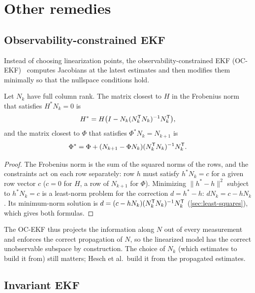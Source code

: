 \section{Other remedies}

\subsection{Observability-constrained EKF}

Instead of choosing linearization points, the observability-constrained EKF (OC-EKF)~\cite{hesch2014consistency} computes Jacobians at
the latest estimates and then modifies them minimally so that the nullspace conditions hold.

\begin{proposition}
\label{prop:oc-ekf}
Let $N_k$ have full column rank. The matrix closest to $H$ in the Frobenius norm that satisfies $H^*N_k = 0$ is
\begin{equation}
  H^* = H\big(I - N_k(N_k^{\mathsf{T}} N_k)^{-1} N_k^{\mathsf{T}}\big),
\end{equation}
and the matrix closest to $\Phi$ that satisfies $\Phi^*N_k = N_{k+1}$ is
\begin{equation}
  \Phi^* = \Phi + (N_{k+1} - \Phi N_k)(N_k^{\mathsf{T}} N_k)^{-1} N_k^{\mathsf{T}} .
\end{equation}
\end{proposition}
\begin{proof}
The Frobenius norm is the sum of the squared norms of the rows, and the constraints act on each row separately: row $h$ must satisfy
$h^*N_k = c$ for a given row vector $c$ ($c = 0$ for $H$, a row of $N_{k+1}$ for $\Phi$). Minimizing $\|h^* - h\|^2$ subject to $h^*N_k = c$ is a least-norm problem
for the correction $d = h^* - h$: $dN_k = c - hN_k$. Its minimum-norm solution is $d = (c - hN_k)(N_k^{\mathsf{T}} N_k)^{-1} N_k^{\mathsf{T}}$ (\cref{sec:least-squares}), which gives both
formulas.
\end{proof}

The OC-EKF thus projects the information along $N$ out of every measurement and enforces the correct propagation of $N$, so the linearized
model has the correct unobservable subspace by construction. The choice of $N_k$ (which estimates to build it from) still matters; Hesch et
al.\ build it from the propagated estimates.

\subsection{Invariant EKF}

